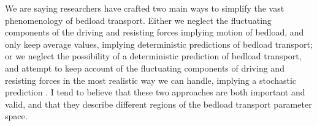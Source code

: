 \documentclass{article}
\begin{document}
%
%
%





























We are saying researchers have crafted two main ways to simplify the vast phenomenology of bedload transport. 
Either we neglect the fluctuating components of the driving and resisting forces implying motion of bedload, and only keep average values, implying deterministic predictions of bedload transport; or we neglect the possibility of a deterministic prediction of bedload transport, and attempt to keep account of the fluctuating components of driving and resisting forces in the most realistic way we can handle, implying a stochastic prediction \citep{Ferreira2015}. 
I tend to believe that these two approaches are both important and valid, and that they describe different regions of the bedload transport parameter space. 
 
\end{document}
